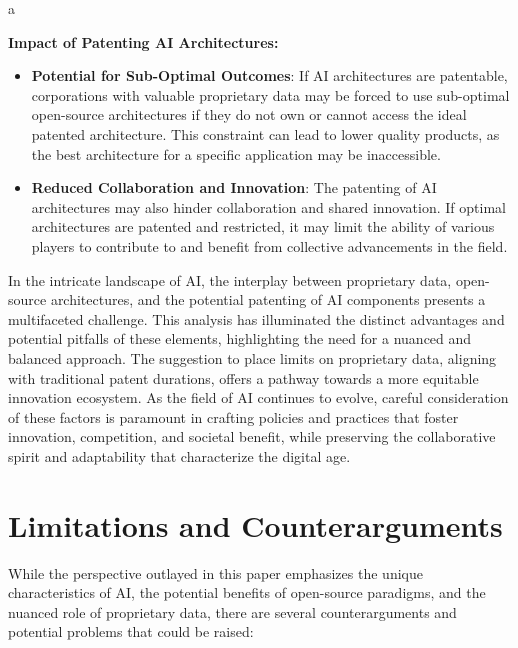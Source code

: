 a\documentclass{article}[10pt]
\begin{document}
\noindent \textbf{Impact of Patenting AI Architectures:}

\begin{itemize}
	\item \textbf{Potential for Sub-Optimal Outcomes}: If AI architectures are patentable, corporations with valuable proprietary data may be forced to use sub-optimal open-source architectures if they do not own or cannot access the ideal patented architecture. This constraint can lead to lower quality products, as the best architecture for a specific application may be inaccessible.
	\item \textbf{Reduced Collaboration and Innovation}: The patenting of AI architectures may also hinder collaboration and shared innovation. If optimal architectures are patented and restricted, it may limit the ability of various players to contribute to and benefit from collective advancements in the field.
\end{itemize}

In the intricate landscape of AI, the interplay between proprietary data, open-source architectures, and the potential patenting of AI components presents a multifaceted challenge. This analysis has illuminated the distinct advantages and potential pitfalls of these elements, highlighting the need for a nuanced and balanced approach. The suggestion to place limits on proprietary data, aligning with traditional patent durations, offers a pathway towards a more equitable innovation ecosystem. As the field of AI continues to evolve, careful consideration of these factors is paramount in crafting policies and practices that foster innovation, competition, and societal benefit, while preserving the collaborative spirit and adaptability that characterize the digital age.

\section{Limitations and Counterarguments}

While the perspective outlayed in this paper emphasizes the unique characteristics of AI, the potential benefits of open-source paradigms, and the nuanced role of proprietary data, there are several counterarguments and potential problems that could be raised:
\end{document}
